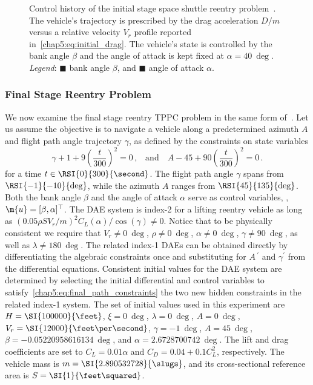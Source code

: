 \begin{figure}[htb]
  \centering
  \small{}
  \caption{Control history of the initial stage space shuttle reentry problem~\cite{brenan1995numerical}. The vehicle's trajectory is prescribed by the drag acceleration $D/m$ versus a relative velocity $V_r$ profile reported in~\eqref{chap5:eq:initial_drag}. The vehicle's state is controlled by the bank angle $\beta$ and the angle of attack is kept fixed at $\alpha = \SI{40}{\deg}$. \emph{Legend}: \textcolor{mycolor1}{$\blacksquare$} bank angle $\beta$, and \textcolor{mycolor2}{$\blacksquare$} angle of attack $\alpha$.}
  \label{chap5:fig:tppc_initial}
\end{figure}

\subsubsection{Final Stage Reentry Problem}

We now examine the final stage reentry \ac{TPPC} problem in the same form of~\cite{brenan1995numerical}. Let us assume the objective is to navigate a vehicle along a predetermined azimuth $A$ and flight path angle trajectory $\gamma$, as defined by the constraints on state variables
%
\begin{equation}
  \gamma + 1 + 9\left(\dfrac{t}{300}\right)^2 = 0 \, \text{,}
  \quad \text{and} \quad
  A - 45 + 90\left(\dfrac{t}{300}\right)^2 = 0 \, \text{.}
  \label{chap5:eq:final_path_constraints}
\end{equation}
%
for a time $t \in \RSI{0}{300}{\second}$. The flight path angle $\gamma$ spans from $\RSI{-1}{-10}{\deg}$, while the azimuth $A$ ranges from $\RSI{45}{135}{\deg}$. Both the bank angle $\beta$ and the angle of attack $\alpha$ serve as control variables, \ie{}, $\m{u} = [\beta, \alpha]^\top$. The \ac{DAE} system is index-2 for a lifting reentry vehicle as long as $(0.05 \rho S V_r/m)^2 C_L(\alpha)/\cos(\gamma) \neq 0$. Notice that to be physically consistent we require that $V_r \neq \SI{0}{\deg}$, $\rho\neq \SI{0}{\deg}$, $\alpha \neq \SI{0}{\deg}$, $\gamma \neq \SI{90}{\deg}$, as well as $\lambda \neq \SI{180}{\deg}$. The related index-1 \acp{DAE} can be obtained directly by differentiating the algebraic constraints once and substituting for $A{\,}^\prime$ and $\gamma^\prime$ from the differential equations. Consistent initial values for the \ac{DAE} system are determined by selecting the initial differential and control variables to satisfy~\eqref{chap5:eq:final_path_constraints} the two new hidden constraints in the related index-1 system. The set of initial values used in this experiment are $H = \SI{100000}{\feet}$, $\xi = \SI{0}{\deg}$, $\lambda = \SI{0}{\deg}$, $A = \SI{0}{\deg}$, $V_r = \SI{12000}{\feet\per\second}$, $\gamma = \SI{-1}{\deg}$, $A = \SI{45}{\deg}$, $\beta = \SI{-0.05220958616134}{\deg}$, and $\alpha = \SI{2.6728700742}{\deg}$. The lift and drag coefficients are set to $C_L = 0.01\alpha$ and $C_D = 0.04 + 0.1C_L^2$, respectively. The vehicle mass is $m = \SI{2.890532728}{\slugs}$, and its cross-sectional reference area is $S = \SI{1}{\feet\squared}$.

